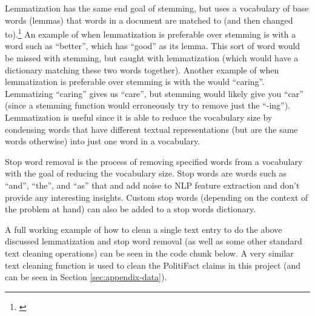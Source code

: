 \documentclass[12pt]{article}
\begin{document}
Lemmatization has the same end goal of stemming, but uses a vocabulary
of base words (lemmas) that words in a document are matched to (and then
changed to).\footnote{\citet{StemmingLemmatization}} An example of when
lemmatization is preferable over stemming is with a word such as
``better'', which has ``good'' as its lemma. This sort of word would be
missed with stemming, but caught with lemmatization (which would have a
dictionary matching these two words together). Another example of when
lemmatization is preferable over stemming is with the would ``caring''.
Lemmatizing ``caring'' gives us ``care'', but stemming would likely give
you ``car'' (since a stemming function would erroneously try to remove
just the ``-ing''). Lemmatization is useful since it is able to reduce
the vocabulary size by condensing words that have different textual
representations (but are the same words otherwise) into just one word in
a vocabulary.

Stop word removal is the process of removing specified words from a
vocabulary with the goal of reducing the vocabulary size. Stop words are
words such as ``and'', ``the'', and ``as'' that and add noise to NLP
feature extraction and don't provide any interesting insights. Custom
stop words (depending on the context of the problem at hand) can also be
added to a stop words dictionary.

A full working example of how to clean a single text entry to do the
above discussed lemmatization and stop word removal (as well as some
other standard text cleaning operations) can be seen in the code chunk
below. A very similar text cleaning function is used to clean the
PolitiFact claims in this project (and can be seen in Section
\ref{sec:appendix-data}).
\end{document}
